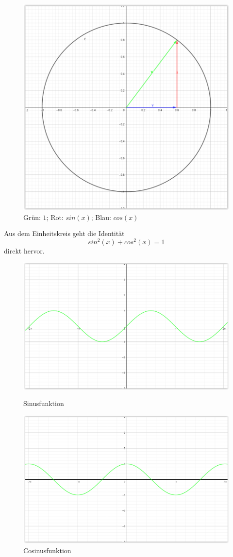 		\begin{figure}[H]
		  \centering
		  \includegraphics[width=0.35\linewidth]{./img/funktionen_einheitskreis_sin_cos.png}
		  \caption{Grün: $1$; Rot: $sin(x)$; Blau: $cos(x)$}
		  \label{fig:funkt_e_ln}
		\end{figure}
		Aus dem Einheitskreis geht die Identität
		\begin{equation}
		  sin^2(x) + cos^2(x) = 1
		\end{equation}
		direkt hervor.
		\begin{figure}[H] 
		\centering
		\begin{minipage}{.5\textwidth}
		  \centering
		  \includegraphics[width=0.9\linewidth]{./img/funktionen_sin.png}
		  \caption{Sinusfunktion}
		  \label{fig:funkt_sin}
		\end{minipage}%
		\begin{minipage}{.5\textwidth}
		  \centering
		  \includegraphics[width=0.9\linewidth]{./img/funktionen_cos.png}
		  \caption{Cosinusfunktion}
		  \label{fig:funkt_cos}
		\end{minipage}
		\end{figure}
